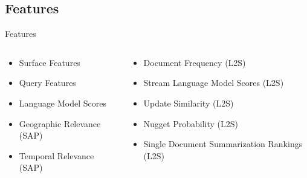 \subsection{Features}
\begin{frame}{Features}
  \begin{columns}
      \begin{column}{.5\textwidth}
      \begin{itemize}
        \item Surface Features
        \item Query Features
        \item Language Model Scores
        \item Geographic Relevance (SAP)
        \item Temporal Relevance (SAP)
      \end{itemize}
    \end{column}
    \begin{column}{.5\textwidth}
      \begin{itemize}
        \item Document Frequency (L2S)
        \item Stream Language Model Scores (L2S)
        \item Update Similarity (L2S)
        \item Nugget Probability (L2S)
        \item Single Document Summarization Rankings (L2S)
      \end{itemize}
   \end{column}
  \end{columns}
\end{frame}


